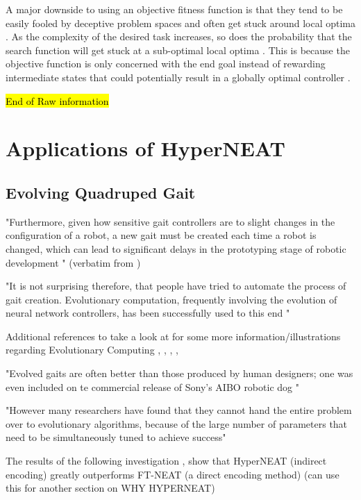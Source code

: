 \documentclass[conference]{IEEEtran}
\begin{document}
A major downside to using an objective fitness function
is that they tend to be easily fooled by deceptive problem
spaces and often get stuck around local optima \cite{lehman2011abandoning}.
As the complexity of the desired task increases, so does the probability that the search function will get stuck at a sub-optimal local optima \cite{FiciciPollack1998}.
This is because the objective function is only concerned with the end goal instead of rewarding intermediate states that could potentially result in a globally optimal controller \cite{lehman2011abandoning}.

\hl{End of Raw information}

\section{Applications of HyperNEAT}

\subsection{Evolving Quadruped Gait}
"Furthermore, given how sensitive gait controllers are to slight changes in the configuration of a robot, a new gait must be created each time a robot is changed, which can lead to significant delays in the prototyping stage of robotic development \cite{hornby2005autonomous}" (verbatim from \cite{clune2009evolving} )

"It is not surprising therefore, that people have tried to automate the process of gait creation. Evolutionary computation, frequently involving the evolution of neural network controllers, has been successfully used to this end \cite{clune2009evolving}"

Additional references to take a look at for some more information/illustrations regarding Evolutionary Computing 
\cite{hornby2005autonomous},
\cite{hornby2003generative},
\cite{gruau1994automatic},
\cite{sims1994evolving},

"Evolved gaits are often better than those produced by human designers; one was even included on te commercial release of Sony's AIBO robotic dog \cite{hornby2005autonomous}"

"However many researchers have found that they cannot hand the entire problem over to evolutionary algorithms, because of the large number of parameters that need to be simultaneously tuned to achieve success" \cite{clune2009evolving}

The results of the following investigation \cite{clune2009evolving}, show that HyperNEAT (indirect encoding) greatly outperforms FT-NEAT (a direct encoding method)
(can use this for another section on WHY HYPERNEAT)
\end{document}
